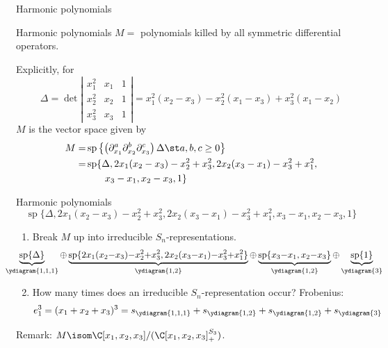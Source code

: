 \documentclass[dvipsnames]{beamer}
\renewcommand{\Span}{\operatorname{sp}}
\theoremstyle{definition}
\begin{document}
\begin{frame}{Harmonic polynomials}
  \begin{block}{Harmonic polynomials}
   \(M =\) polynomials killed by all symmetric differential
   operators.
  \end{block}\pause
  Explicitly, for
   \[
     \Delta = \det \left|
       \begin{matrix}
         x_1^2 & x_1 & 1\\
         x_2^2 & x_2 & 1\\
         x_3^2 & x_3 & 1
       \end{matrix}
     \right| = x_1^2(x_2-x_3) - x_2^2 (x_1 - x_3) + x_3^2(x_1-x_2)
   \]\pause
   \(M\) is the vector space given by\pause
   \begin{align*}
       M  = & \Span\left\{
\left(           \partial_{x_1}^a
           \partial_{x_2}^b  \partial_{x_3}^c
\right)         \Delta \st a,b,c \geq 0\right\} \\
        = & \Span\{\Delta, 2x_1(x_2-x_3)-x_2^2+x_3^2,
            2x_2(x_3-x_1)-x_3^2+x_1^2, \\
       & \phantom{\Span\{\}}x_3-x_1, x_2-x_3,1\}
   \end{align*}
\end{frame}
\begin{frame}{Harmonic polynomials}
\[
\Span\{\Delta, 2x_1(x_2-x_3)-x_2^2+x_3^2,
            2x_2(x_3-x_1)-x_3^2+x_1^2, 
       x_3-x_1, x_2-x_3,1\}
  \]\pause 
  \begin{enumerate}
\item Break \(M\) up into irreducible \(S_n\)-representations. \pause
  \[
    \hspace{-2.9em}
    \scalebox{0.95}{\(
      \underbrace{\Span\{\Delta\}}_{\ydiagram{1,1,1}} {\oplus} \underbrace{\Span\{2x_1(x_2{-}x_3){-}x_2^2{+}x_3^2,
        2x_2(x_3{-}x_1){-}x_3^2{+}x_1^2\}}_{\ydiagram{1,2}} {\oplus}
      \underbrace{\Span\{x_3{-}x_1, x_2{-}x_3\}}_{\ydiagram{1,2}} {\oplus} \underbrace{\Span\{1\}}_{\ydiagram{3}}\)}
  \]\pause
  \item How many times does an irreducible \(S_n\)-representation occur? \pause
    Frobenius: \pause
    \[
      e_1^3 = (x_1+x_2+x_3)^3 = s_{\ydiagram{1,1,1}} + s_{\ydiagram{1,2}} +
      s_{\ydiagram{1,2}} + s_{\ydiagram{3}}
    \]
  \end{enumerate}
  \pause
  Remark: \(M \isom \C[x_1,x_2,x_3]/(\C[x_1,x_2,x_3]^{S_3}_+)\).
\end{frame}
\end{document}
